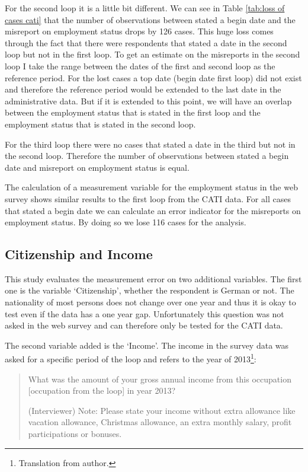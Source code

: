 For the second loop it is a little bit different. We can see in Table \ref{tab:loss of cases cati} that the number of observations between stated a begin date and the misreport on employment status drops by 126 cases. This huge loss comes through the fact that there were respondents that stated a date in the second loop but not in the first loop. To get an estimate on the misreports in the second loop I take the range between the dates of the first and second loop as the reference period. For the lost cases a top date (begin date first loop) did not exist and therefore the reference period would be extended to the last date in the administrative data. But if it is extended to this point, we will have an overlap between the employment status that is stated in the first loop and the employment status that is stated in the second loop.

For the third loop there were no cases that stated a date in the third but not in the second loop. Therefore the number of observations between stated a begin date and misreport on employment status is equal.

The calculation of a measurement variable for the employment status in the web survey shows similar results to the first loop from the CATI data. For all cases that stated a begin date we can calculate an error indicator for the misreports on employment status. By doing so we lose 116 cases for the analysis.  

\subsection{Citizenship and Income}

This study evaluates the measurement error on two additional variables. The first one is the variable `Citizenship', whether the respondent is German or not. The nationality of most persons does not change over one year and thus it is okay to test even if the data has a one year gap. Unfortunately this question was not asked in the web survey and can therefore only be tested for the CATI data.  

The second variable added is the `Income'. The income in the survey data was asked for a specific period of the loop and refers to the year of 2013\footnote{Translation from author.}:


\begin{quote}
\begin {small}

What was the amount of your gross annual income from this occupation [occupation from the loop] in year 2013?

(Interviewer) Note: Please state your income without extra allowance like vacation allowance, Christmas allowance, an extra monthly salary, profit participations or bonuses. 

\end{small}
\end{quote}


